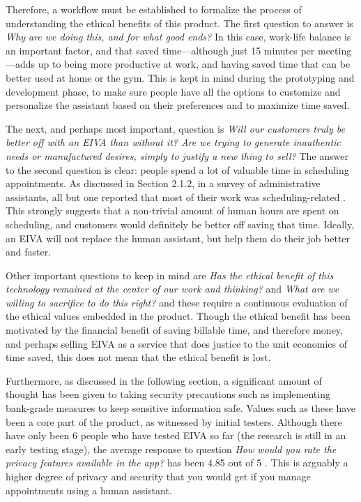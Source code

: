 \documentclass{article}
\begin{document}
Therefore, a workflow must be established to formalize the process of understanding the ethical benefits of this product. The first question to answer is \emph{Why are we doing this, and for what good ends?} In this case, work-life balance is an important factor, and that saved time---although just 15 minutes per meeting---adds up to being more productive at work, and having saved time that can be better used at home or the gym. This is kept in mind during the prototyping and development phase, to make sure people have all the options to customize and personalize the assistant based on their preferences and to maximize time saved.

The next, and perhaps most important, question is \emph{Will our customers truly be better off with an EIVA than without it? Are we trying to generate inauthentic needs or manufactured desires, simply to justify a new thing to sell?} The answer to the second question is clear: people spend a lot of valuable time in scheduling appointments. As discussed in Section 2.1.2, in a survey of administrative assistants, all but one reported that most of their work was scheduling-related \cite{erickson_assistance:_2008}. This strongly suggests that a non-trivial amount of human hours are spent on scheduling, and customers would definitely be better off saving that time. Ideally, an EIVA will not replace the human assistant, but help them do their job better and faster.

Other important questions to keep in mind are \emph{Has the ethical benefit of this technology remained at the center of our work and thinking?} and \emph{What are we willing to sacrifice to do this right?} and these require a continuous evaluation of the ethical values embedded in the product. Though the ethical benefit has been motivated by the financial benefit of saving billable time, and therefore money, and perhaps selling EIVA as a service that does justice to the unit economics of time saved, this does not mean that the ethical benefit is lost.

Furthermore, as discussed in the following section, a significant amount of thought has been given to taking security precautions such as implementing bank-grade measures to keep sensitive information safe. Values such as these have been a core part of the product, as witnessed by initial testers. Although there have only been 6 people who have tested EIVA so far (the research is still in an early testing stage), the average response to question \emph{How would you rate the privacy features available in the app?} has been 4.85 out of 5 \cite{chowdhary_anandchowdhary/thesis_2020}. This is arguably a higher degree of privacy and security that you would get if you manage appointments using a human assistant.
\end{document}
